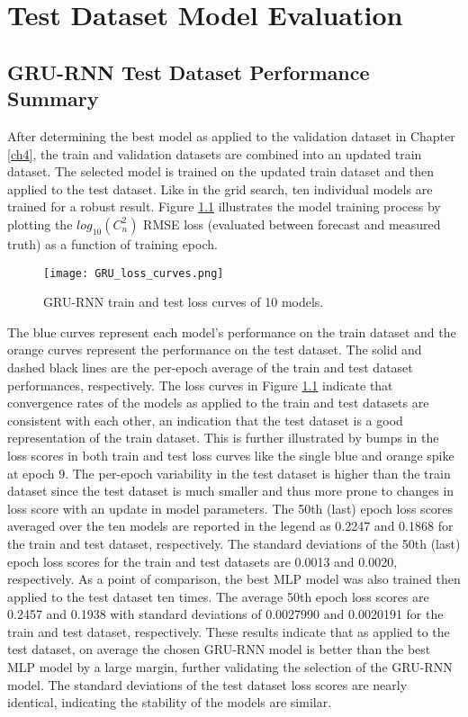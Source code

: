 \chapter{Test Dataset Model Evaluation}
\label{ch5}

\section{GRU-RNN Test Dataset Performance Summary}
After determining the best model  as applied to the validation dataset in Chapter \ref{ch4}, the train and validation datasets are combined into an updated train dataset. The selected model is trained on the updated train dataset and then applied to the test dataset. Like in the grid search, ten individual models are trained for a robust result. Figure \ref{fig:GRU_train_test_loss_curves} illustrates the model training process by plotting the $log_{10}(C_{n}^{2})$ RMSE loss (evaluated between forecast and measured truth) as a function of training epoch.
\begin{figure}[h!]
	\centering
	\texttt{[image: GRU\_loss\_curves.png]}
	\caption{GRU-RNN train and test loss curves of 10 models.}
	\label{fig:GRU_train_test_loss_curves}
\end{figure}
The blue curves represent each model's performance on the train dataset and the orange curves represent the performance on the test dataset. The solid and dashed black lines are the per-epoch average of the train and test dataset performances, respectively. The loss curves in Figure \ref{fig:GRU_train_test_loss_curves} indicate that convergence rates of the models as applied to the train and test datasets are consistent with each other, an indication that the test dataset is a good representation of the train dataset. This is further illustrated by bumps in the loss scores in both train and test loss curves like the single blue and orange spike at epoch 9. The per-epoch variability in the test dataset is higher than the train dataset since the test dataset is much smaller and thus more prone to changes in loss score with an update in model parameters. The 50th (last) epoch loss scores averaged over the ten models are reported in the legend as 0.2247 and 0.1868 for the train and test dataset, respectively. The standard deviations of the 50th (last) epoch loss scores for the train and test datasets are 0.0013 and 0.0020, respectively. As a point of comparison, the best \ac{MLP} model was also trained then applied to the test dataset ten times. The average 50th epoch loss scores are 0.2457 and 0.1938 with standard deviations of 0.0027990 and 0.0020191 for the train and test dataset, respectively. These results indicate that as applied to the test dataset, on average the chosen \ac{GRU-RNN} model is better than the best \ac{MLP} model by a large margin, further validating the selection of the \ac{GRU-RNN} model. The standard deviations of the test dataset loss scores are nearly identical, indicating the stability of the models are similar.

